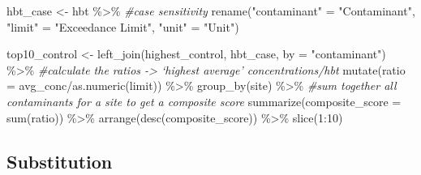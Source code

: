 \documentclass[12pt, twoside]{amherstthesis}
\newenvironment{Shaded}{\begin{snugshade}}{\end{snugshade}}
\newcommand{\AttributeTok}[1]{\textcolor[rgb]{0.77,0.63,0.00}{#1}}
\newcommand{\CommentTok}[1]{\textcolor[rgb]{0.56,0.35,0.01}{\textit{#1}}}
\newcommand{\DecValTok}[1]{\textcolor[rgb]{0.00,0.00,0.81}{#1}}
\newcommand{\FunctionTok}[1]{\textcolor[rgb]{0.00,0.00,0.00}{#1}}
\newcommand{\NormalTok}[1]{#1}
\newcommand{\OtherTok}[1]{\textcolor[rgb]{0.56,0.35,0.01}{#1}}
\newcommand{\SpecialCharTok}[1]{\textcolor[rgb]{0.00,0.00,0.00}{#1}}
\newcommand{\StringTok}[1]{\textcolor[rgb]{0.31,0.60,0.02}{#1}}
\begin{document}
\begin{Shaded}
\begin{Highlighting}[]
\NormalTok{hbt\_case }\OtherTok{\textless{}{-}}\NormalTok{ hbt }\SpecialCharTok{\%\textgreater{}\%} \CommentTok{\#case sensitivity}
  \FunctionTok{rename}\NormalTok{(}\StringTok{"contaminant"} \OtherTok{=} \StringTok{"Contaminant"}\NormalTok{,}
         \StringTok{"limit"} \OtherTok{=} \StringTok{"Exceedance Limit"}\NormalTok{,}
         \StringTok{"unit"} \OtherTok{=} \StringTok{"Unit"}\NormalTok{) }
  
\NormalTok{top10\_control }\OtherTok{\textless{}{-}} \FunctionTok{left\_join}\NormalTok{(highest\_control, hbt\_case, }
                           \AttributeTok{by =} \StringTok{"contaminant"}\NormalTok{) }\SpecialCharTok{\%\textgreater{}\%}
  \CommentTok{\#calculate the ratios {-}\textgreater{} ‘highest average’ concentrations/hbt}
  \FunctionTok{mutate}\NormalTok{(}\AttributeTok{ratio =}\NormalTok{ avg\_conc}\SpecialCharTok{/}\FunctionTok{as.numeric}\NormalTok{(limit)) }\SpecialCharTok{\%\textgreater{}\%} 
  \FunctionTok{group\_by}\NormalTok{(site) }\SpecialCharTok{\%\textgreater{}\%}
  \CommentTok{\#sum together all contaminants for a site to get a composite score}
  \FunctionTok{summarize}\NormalTok{(}\AttributeTok{composite\_score =} \FunctionTok{sum}\NormalTok{(ratio)) }\SpecialCharTok{\%\textgreater{}\%} 
  \FunctionTok{arrange}\NormalTok{(}\FunctionTok{desc}\NormalTok{(composite\_score)) }\SpecialCharTok{\%\textgreater{}\%}
  \FunctionTok{slice}\NormalTok{(}\DecValTok{1}\SpecialCharTok{:}\DecValTok{10}\NormalTok{)}
\end{Highlighting}
\end{Shaded}
\hypertarget{substitution}{%
\subsection{Substitution}\label{substitution}}
\end{document}
